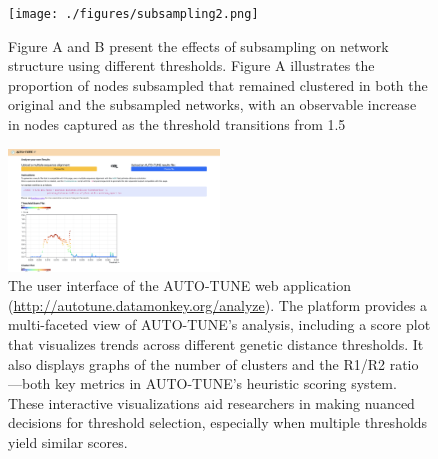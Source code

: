 \documentclass[utf8]{FrontiersinHarvard} %
\begin{document}
\begin{figure}[h!]
  \centering
  \texttt{[image: ./figures/subsampling2.png]}
	\caption{
		Figure A and B present the effects of subsampling on network structure using different thresholds. Figure A illustrates the proportion of nodes subsampled that remained clustered in both the original and the subsampled networks, with an observable increase in nodes captured as the threshold transitions from 1.5%
	}\label{fig:subsampling2}
\end{figure}

\begin{figure}[h!]
  \centering
  \includegraphics[width=0.5\textwidth]{./figures/webapp.png}
	\caption{ The user interface of the AUTO-TUNE web application
		(\url{http://autotune.datamonkey.org/analyze}). The platform provides a
		multi-faceted view of AUTO-TUNE's analysis, including a score plot that
		visualizes trends across different genetic distance thresholds. It also
		displays graphs of the number of clusters and the R1/R2 ratio—both key metrics
		in AUTO-TUNE's heuristic scoring system. These interactive visualizations aid
		researchers in making nuanced decisions for threshold selection, especially
		when multiple thresholds yield similar scores.
	}\label{fig:webapp}
\end{figure}
\end{document}
